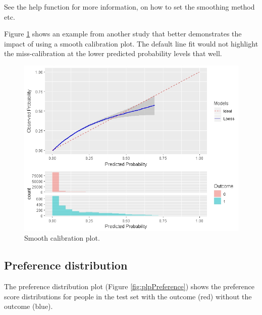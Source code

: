 \documentclass[11pt]{book}
\begin{document}
See the help function for more information, on how to set the smoothing
method etc.

Figure \ref{fig:plpSmoothCal} shows an example from another study that
better demonstrates the impact of using a smooth calibration plot. The
default line fit would not highlight the miss-calibration at the lower
predicted probability levels that well.

\begin{figure}

{\centering \includegraphics[width=1\linewidth]{images/PatientLevelPrediction/smoothCalibration} 

}

\caption{Smooth calibration plot.}\label{fig:plpSmoothCal}
\end{figure}

\subsection{Preference distribution}\label{preference-distribution}

The preference distribution plot (Figure \ref{fig:plpPreference}) shows
the preference score distributions for people in the test set with the
outcome (red) without the outcome (blue).
\end{document}
